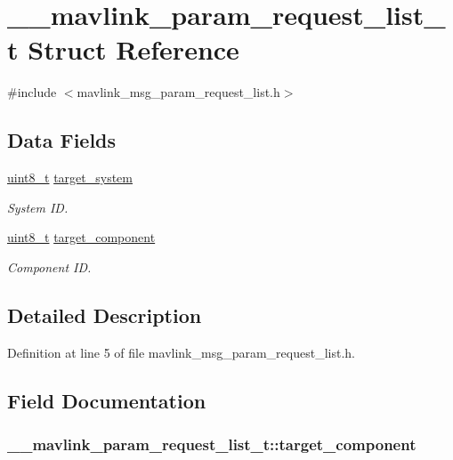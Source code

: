 \hypertarget{struct____mavlink__param__request__list__t}{\section{\-\_\-\-\_\-mavlink\-\_\-param\-\_\-request\-\_\-list\-\_\-t Struct Reference}
\label{struct____mavlink__param__request__list__t}
}


{\ttfamily \#include $<$mavlink\-\_\-msg\-\_\-param\-\_\-request\-\_\-list.\-h$>$}

\subsection*{Data Fields}
\begin{DoxyCompactItemize}
\item 
\hyperlink{stdint_8h_aba7bc1797add20fe3efdf37ced1182c5}{uint8\-\_\-t} \hyperlink{struct____mavlink__param__request__list__t_aae3ba45d3ff75c3603ec6bf4eb58b244}{target\-\_\-system}
\begin{DoxyCompactList}\small\item\em System I\-D. \end{DoxyCompactList}\item 
\hyperlink{stdint_8h_aba7bc1797add20fe3efdf37ced1182c5}{uint8\-\_\-t} \hyperlink{struct____mavlink__param__request__list__t_adf6602f61af11ec222fdabd850abdf2d}{target\-\_\-component}
\begin{DoxyCompactList}\small\item\em Component I\-D. \end{DoxyCompactList}\end{DoxyCompactItemize}


\subsection{Detailed Description}


Definition at line 5 of file mavlink\-\_\-msg\-\_\-param\-\_\-request\-\_\-list.\-h.



\subsection{Field Documentation}
\hypertarget{struct____mavlink__param__request__list__t_adf6602f61af11ec222fdabd850abdf2d}{
\subsubsection[{target\-\_\-component}]{ \-\_\-\-\_\-mavlink\-\_\-param\-\_\-request\-\_\-list\-\_\-t\-::target\-\_\-component}}\label{struct____mavlink__param__request__list__t_adf6602f61af11ec222fdabd850abdf2d}


